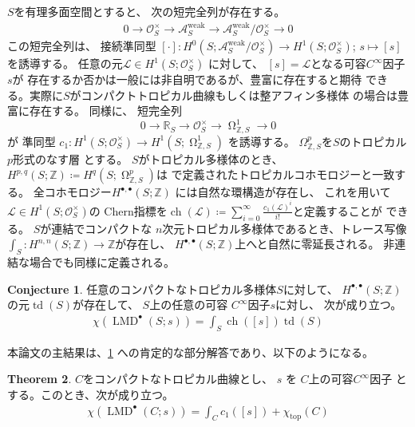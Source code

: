 \documentclass[uplatex,dvipdfmx,12pt]{jsarticle}
\numberwithin{equation}{section}
\theoremstyle{definition}
\newtheorem{theorem}{Theorem}[section]
\newtheorem{conjecture}[theorem]{Conjecture}
\newcommand{\deq}{\coloneqq}
\newcommand{\opn}[1]{\operatorname{#1}}
\DeclareMathOperator{\tform}{\Omega}
\begin{document}
$S$を有理多面空間とすると、
次の短完全列が存在する。
\begin{align}
0\to \mathcal{O}_S^{\times} \to 
\mathcal{A}^{\mathrm{weak}}_S \to 
\mathcal{A}^{\mathrm{weak}}_S/\mathcal{O}_S^{\times}
\to 0
\end{align}
この短完全列は、
接続準同型
$
[\cdot] \colon 
H^{0}(S;\mathcal{A}^{\mathrm{weak}}_S/\mathcal{O}_S^{\times})
\to H^{1}(S;\mathcal{O}_S^{\times})
$;
$
s\mapsto [s]
$
を誘導する。
任意の元$\mathcal{L}\in H^{1}(S;\mathcal{O}^{\times}_S)$
に対して、
$[s]=\mathcal{L}$となる可容$C^{\infty}$因子
$s$が
存在するか否かは一般には非自明であるが、豊富に存在すると期待
できる。実際に$S$がコンパクトトロピカル曲線もしくは整アフィン多様体
の場合は豊富に存在する。
同様に、
短完全列
\begin{equation}
0
\to \mathbb{R}_S
\to \mathcal{O}^{\times}_S
\to \tform_{\mathbb{Z},S}^{1}
\to 0
\end{equation}
が
準同型
$
c_1\colon H^{1}(S;\mathcal{O}^{\times}_S)
\to H^{1}(S;\tform_{\mathbb{Z},S}^{1})
$
を誘導する。
$\Omega_{\mathbb{Z},S}^{p}$を$S$のトロピカル$p$形式のなす層
とする\cite{gross2019sheaftheoretic}。
$S$がトロピカル多様体のとき、
$H^{p,q}(S;\mathbb{Z})\deq H^{q}(S;\tform_{\mathbb{Z},S}^{p})$は
\cite{mikhalkinTropicalEigenwaveIntermediate2014a}
で定義されたトロピカルコホモロジーと一致する。
全コホモロジー$H^{\bullet,\bullet}(S;\mathbb{Z})$
には自然な環構造が存在し、
これを用いて
$\mathcal{L}\in H^{1}(S;\mathcal{O}_S^{\times})$の
Chern指標を$\opn{ch}(\mathcal{L})\deq
\sum_{i=0}^{\infty}\frac{c_1(\mathcal{L})^{i}}{i!}$と定義することが
できる。
$S$が連結でコンパクトな
$n$次元トロピカル多様体であるとき、トレース写像
$\int_{S}\colon H^{n,n}(S;\mathbb{Z})\to \mathbb{Z}$が存在し、
$H^{\bullet,\bullet}(S;\mathbb{Z})$上へと自然に零延長される。
非連結な場合でも同様に定義される。
\setcounter{section}{1}
\setcounter{condition}{1}
\begin{conjecture} \label{conjecture-mirror-tropical-rr}
任意のコンパクトなトロピカル多様体$S$に対して、
$H^{\bullet,\bullet}(S;\mathbb{Z})$
の元$\opn{td}(S)$が存在して、
$S$上の任意の可容
$C^{\infty}$因子$s$に対し、
次が成り立つ。
\begin{align}
\chi(\opn{LMD}^{\bullet}(S;s))=
\int_{S}\opn{ch}([s])\opn{td}(S)
\end{align}
\end{conjecture}


本論文の主結果は、\cref{conjecture-mirror-tropical-rr}
への肯定的な部分解答であり、以下のようになる。

\begin{theorem} \label{theorem-main-1}
$C$をコンパクトなトロピカル曲線とし、
$s$ を $C$上の可容$C^{\infty}$因子 
とする。このとき、次が成り立つ。
\begin{align}
\chi(\opn{LMD}^{\bullet}(C;s))=\int_C c_1([s])+
\chi_{\opn{top}}(C)
\end{align}
\end{theorem}
\end{document}
